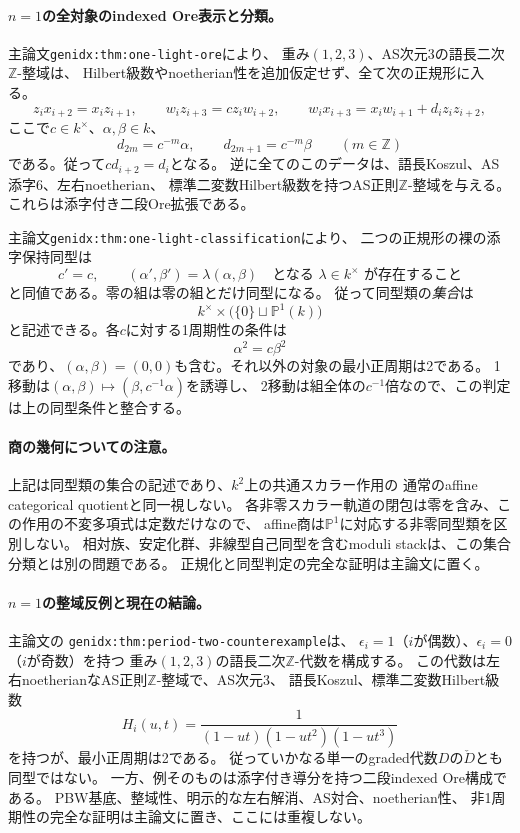\documentclass[11pt,a4paper]{ltjsarticle}
\begin{document}
\paragraph{$n=1$の全対象のindexed Ore表示と分類。}
主論文\texttt{genidx:thm:one-light-ore}により、
重み$(1,2,3)$、AS次元3の語長二次$\mathbb Z$-整域は、
Hilbert級数やnoetherian性を追加仮定せず、全て次の正規形に入る。
\[
z_i x_{i+2}=x_i z_{i+1},\qquad
w_i z_{i+3}=c z_i w_{i+2},\qquad
w_i x_{i+3}=x_i w_{i+1}+d_i z_i z_{i+2},
\]
ここで$c\in k^\times$、$\alpha,\beta\in k$、
\[
d_{2m}=c^{-m}\alpha,\qquad d_{2m+1}=c^{-m}\beta
\qquad(m\in\mathbb Z)
\]
である。従って$c d_{i+2}=d_i$となる。
逆に全てのこのデータは、語長Koszul、AS添字6、左右noetherian、
標準二変数Hilbert級数を持つAS正則$\mathbb Z$-整域を与える。
これらは添字付き二段Ore拡張である。

主論文\texttt{genidx:thm:one-light-classification}により、
二つの正規形の裸の添字保持同型は
\[
c'=c,\qquad (\alpha',\beta')=\lambda(\alpha,\beta)
\quad\text{となる }\lambda\in k^\times\text{ が存在すること}
\]
と同値である。零の組は零の組とだけ同型になる。
従って同型類の\emph{集合}は
\[
k^\times\times\bigl(\{0\}\sqcup\mathbb P^1(k)\bigr)
\]
と記述できる。各$c$に対する1周期性の条件は
\[
\alpha^2=c\beta^2
\]
であり、$(\alpha,\beta)=(0,0)$も含む。それ以外の対象の最小正周期は2である。
1移動は$(\alpha,\beta)\mapsto(\beta,c^{-1}\alpha)$を誘導し、
2移動は組全体の$c^{-1}$倍なので、この判定は上の同型条件と整合する。

\paragraph{商の幾何についての注意。}
上記は同型類の集合の記述であり、$k^2$上の共通スカラー作用の
通常のaffine categorical quotientと同一視しない。
各非零スカラー軌道の閉包は零を含み、この作用の不変多項式は定数だけなので、
affine商は$\mathbb P^1$に対応する非零同型類を区別しない。
相対族、安定化群、非線型自己同型を含むmoduli stackは、この集合分類とは別の問題である。
正規化と同型判定の完全な証明は主論文に置く。

\paragraph{$n=1$の整域反例と現在の結論。}
主論文の
\texttt{genidx:thm:period-two-counterexample}は、
$\epsilon_i=1$（$i$が偶数）、$\epsilon_i=0$（$i$が奇数）を持つ
重み$(1,2,3)$の語長二次$\mathbb Z$-代数を構成する。
この代数は左右noetherianなAS正則$\mathbb Z$-整域で、AS次元3、
語長Koszul、標準二変数Hilbert級数
\[
H_i(u,t)=\frac{1}{(1-ut)(1-ut^2)(1-ut^3)}
\]
を持つが、最小正周期は2である。
従っていかなる単一のgraded代数$D$の$\check D$とも同型ではない。
一方、例そのものは添字付き導分を持つ二段indexed Ore構成である。
PBW基底、整域性、明示的な左右解消、AS対合、noetherian性、
非1周期性の完全な証明は主論文に置き、ここには重複しない。
\end{document}
